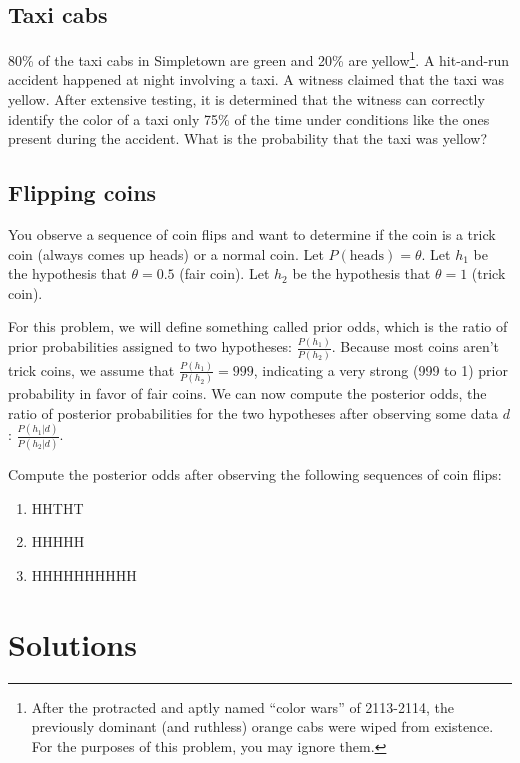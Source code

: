 \documentclass[
  letterpaper,
  DIV=11,
  numbers=noendperiod]{scrreprt}
\providecommand{\tightlist}{%
  \setlength{\itemsep}{0pt}\setlength{\parskip}{0pt}}
\begin{document}
\subsection{Taxi cabs}\label{taxi-cabs}

80\% of the taxi cabs in Simpletown are green and 20\% are
yellow\footnote{After the protracted and aptly named ``color wars'' of
  2113-2114, the previously dominant (and ruthless) orange cabs were
  wiped from existence. For the purposes of this problem, you may ignore
  them.}. A hit-and-run accident happened at night involving a taxi. A
witness claimed that the taxi was yellow. After extensive testing, it is
determined that the witness can correctly identify the color of a taxi
only 75\% of the time under conditions like the ones present during the
accident. What is the probability that the taxi was yellow?

\subsection{Flipping coins}\label{flipping-coins}

You observe a sequence of coin flips and want to determine if the coin
is a trick coin (always comes up heads) or a normal coin. Let
\(P(\text{heads}) = \theta\). Let \(h_1\) be the hypothesis that
\(\theta = 0.5\) (fair coin). Let \(h_2\) be the hypothesis that
\(\theta = 1\) (trick coin).

For this problem, we will define something called prior odds, which is
the ratio of prior probabilities assigned to two hypotheses:
\(\frac{P(h_1)}{P(h_2)}\). Because most coins aren't trick coins, we
assume that \(\frac{P(h_1)}{P(h_2)} = 999\), indicating a very strong
(999 to 1) prior probability in favor of fair coins. We can now compute
the posterior odds, the ratio of posterior probabilities for the two
hypotheses after observing some data \(d\):
\(\frac{P(h_1|d)}{P(h_2|d)}\).

Compute the posterior odds after observing the following sequences of
coin flips:

\begin{enumerate}
\def\labelenumi{\arabic{enumi}.}
\tightlist
\item
  HHTHT
\item
  HHHHH
\item
  HHHHHHHHHH
\end{enumerate}

\section{Solutions}\label{solutions}
\end{document}

